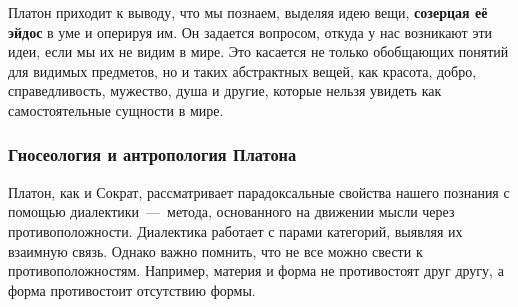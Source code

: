 Платон приходит к выводу, что мы познаем, выделяя идею вещи, \textbf{созерцая её эйдос} в уме и оперируя им. Он задается вопросом, откуда у нас возникают эти идеи, если мы их не видим в мире. Это касается не только обобщающих понятий для видимых предметов, но и таких абстрактных вещей, как красота, добро, справедливость, мужество, душа и другие, которые нельзя увидеть как самостоятельные сущности в мире.

\subsubsection{Гносеология и антропология Платона}


Платон, как и Сократ, рассматривает парадоксальные свойства нашего познания с помощью диалектики~---~метода, основанного на движении мысли через противоположности. Диалектика работает с парами категорий, выявляя их взаимную связь. Однако важно помнить, что не все можно свести к противоположностям. Например, материя и форма не противостоят друг другу, а форма противостоит отсутствию формы.


